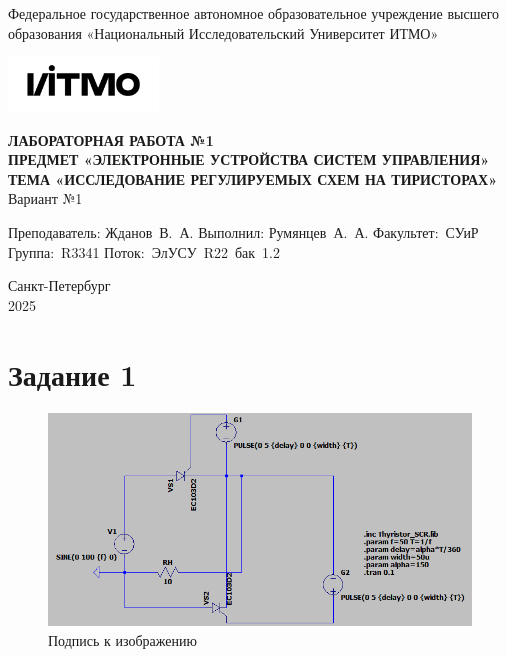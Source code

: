 \documentclass[a4paper, 12pt]{article}
\begin{document}
    \begin{titlepage}

        \begin{center}
        Федеральное государственное автономное образовательное учреждение высшего образования
        «Национальный Исследовательский Университет ИТМО»
        \vfill
        
        \includegraphics[width=0.3\textwidth]{itmo.png} %

        {\large\bf ЛАБОРАТОРНАЯ РАБОТА №1}\\
        {\large\bf ПРЕДМЕТ «ЭЛЕКТРОННЫЕ УСТРОЙСТВА СИСТЕМ УПРАВЛЕНИЯ»}\\
        {\large\bf ТЕМА «ИССЛЕДОВАНИЕ РЕГУЛИРУЕМЫХ СХЕМ НА ТИРИСТОРАХ»}\\
        Вариант №1
        \vfill

        \begin{flushright}
            \begin{minipage}{.45\textwidth}
            {
                \hbox{Преподаватель:}
                \hbox{Жданов В. А.}
                \hbox{}
                \hbox{Выполнил:}
                \hbox{Румянцев А. А.}
                \hbox{}
                \hbox{Факультет: СУиР}
                \hbox{Группа: R3341}
                \hbox{Поток: ЭлУСУ R22 бак 1.2}
            }
            \end{minipage}
        \end{flushright}
        \vfill
  
        Санкт-Петербург\\
        2025
        \end{center}
    \end{titlepage}
    
    \tableofcontents

    \newpage
    \section{Задание 1}
    \begin{figure}[H]
        \centering
        \includegraphics[scale=0.5]{scheme1.png}
        \captionsetup{skip=0pt}
        \caption{Подпись к изображению}
        \label{fig:scheme1}
    \end{figure}
\end{document}
